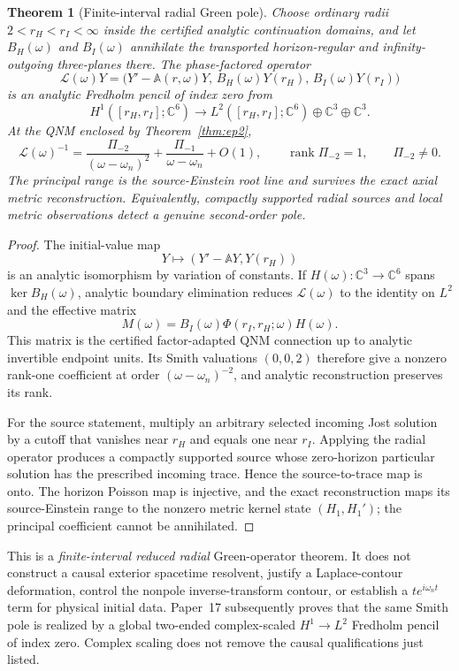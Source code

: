 \documentclass[11pt]{article}
\newtheorem{theorem}{Theorem}[section]
\theoremstyle{definition}
\theoremstyle{remark}
\newcommand{\C}{\mathbb C}
\begin{document}
\begin{theorem}[Finite-interval radial Green pole]
\label{thm:radial-green-pole}
Choose ordinary radii \(2<r_H<r_I<\infty\) inside the certified analytic
continuation domains, and let \(B_H(\omega)\) and \(B_I(\omega)\) annihilate
the transported horizon-regular and infinity-outgoing three-planes there.
The phase-factored operator
\[
\mathscr L(\omega)Y
=\bigl(
Y'-\mathbb A(r,\omega)Y,\,
B_H(\omega)Y(r_H),\,
B_I(\omega)Y(r_I)
\bigr)
\]
is an analytic Fredholm pencil of index zero from
\[
H^1([r_H,r_I];\C^6)
\longrightarrow
L^2([r_H,r_I];\C^6)\oplus\C^3\oplus\C^3 .
\]
At the QNM enclosed by Theorem~\ref{thm:ep2},
\[
\mathscr L(\omega)^{-1}
=\frac{\Pi_{-2}}{(\omega-\omega_n)^2}
+\frac{\Pi_{-1}}{\omega-\omega_n}+O(1),
\qquad
\operatorname{rank}\Pi_{-2}=1,
\qquad
\Pi_{-2}\ne0.
\]
The principal range is the source-Einstein root line and survives the exact
axial metric reconstruction.  Equivalently, compactly supported radial
sources and local metric observations detect a genuine second-order pole.
\end{theorem}

\begin{proof}
The initial-value map
\[
Y\longmapsto(Y'-\mathbb A Y,Y(r_H))
\]
is an analytic isomorphism by variation of constants.  If
\(H(\omega):\C^3\to\C^6\) spans \(\ker B_H(\omega)\), analytic boundary
elimination reduces \(\mathscr L(\omega)\) to the identity on \(L^2\) and
the effective matrix
\[
M(\omega)
=B_I(\omega)\Phi(r_I,r_H;\omega)H(\omega).
\]
This matrix is the certified factor-adapted QNM connection up to analytic
invertible endpoint units.  Its Smith valuations \((0,0,2)\) therefore give
a nonzero rank-one coefficient at order \((\omega-\omega_n)^{-2}\), and
analytic reconstruction preserves its rank.

For the source statement, multiply an arbitrary selected incoming Jost
solution by a cutoff that vanishes near \(r_H\) and equals one near \(r_I\).
Applying the radial operator produces a compactly supported source whose
zero-horizon particular solution has the prescribed incoming trace.  Hence
the source-to-trace map is onto.  The horizon Poisson map is injective, and
the exact reconstruction maps its source-Einstein range to the nonzero
metric kernel state \((H_1,H_1')\); the principal coefficient cannot be
annihilated.
\end{proof}

This is a \emph{finite-interval reduced radial} Green-operator theorem.  It
does not construct a causal exterior spacetime resolvent, justify a
Laplace-contour deformation, control the nonpole inverse-transform contour,
or establish a \(t e^{i\omega_n t}\) term for physical initial data.
Paper~17 subsequently proves that the same Smith pole is realized by a
global two-ended complex-scaled \(H^1\to L^2\) Fredholm pencil of index
zero.  Complex scaling does not remove the causal qualifications just
listed.
\end{document}
